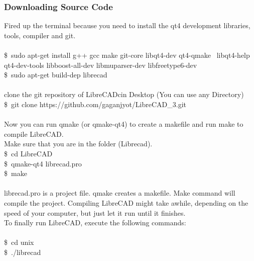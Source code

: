 \subsubsection{Downloading Source Code}

Fired up the terminal because you need to install the qt4 development libraries, tools, compiler and git.\\ \\
\$\ sudo apt-get install g++ gcc make git-core libqt4-dev qt4-qmake \
libqt4-help qt4-dev-tools libboost-all-dev libmuparser-dev libfreetype6-dev \\
\$\ sudo apt-get build-dep librecad\\ \\
clone the git repository of LibreCADcin Desktop (You can use any Directory)\\
\$\ git clone https://github.com/gaganjyot/LibreCAD\_3.git \\ \\
Now you can run qmake (or qmake-qt4) to create a makefile and run make to compile LibreCAD. \\
Make sure that you are in the folder (Librecad).\\
\$\ cd LibreCAD \\
\$\ qmake-qt4 librecad.pro\\
\$\ make\\\\
librecad.pro  is  a  project  file.  qmake  creates  a  makefile.  Make  command  will  compile  the  project.
Compiling  LibreCAD  might  take  awhile,   depending  on  the  speed  of  your  computer,  but  just  let  it  run
until it finishes.\\
To finally run LibreCAD, execute the following commands:\\\\
\$\ cd unix\\
\$\ ./librecad

